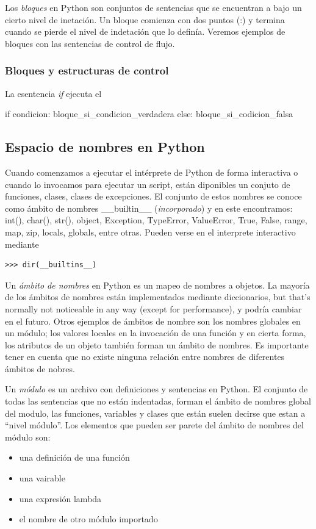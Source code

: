 \documentclass[a4paper]{report}
\begin{document}
Los \emph{bloques} en Python son conjuntos de sentencias que se encuentran a 
bajo un cierto nivel de inetación. Un bloque comienza con dos puntos (:)
y termina cuando se pierde el nivel de indetación que lo definía. Veremos
ejemplos de bloques con las sentencias de control de flujo.

\subsubsection*{Bloques y estructuras de control}
La esentencia \emph{if} ejecuta el 
\begin{python}
if condicion:
    bloque_si_condicion_verdadera
else:
    bloque_si_codicion_falsa
\end{python}





\subsection{Espacio de nombres en Python}
Cuando comenzamos a ejecutar el intérprete de Python de forma interactiva o cuando
lo invocamos para ejecutar un script, están diponibles un conjuto de funciones, clases,
clases de excepciones. El conjunto de estos nombres se conoce como ámbito de nombres 
\_\_builtin\_\_ (\emph{incorporado}) y en este encontramos: int(), char(), str(), object, 
Exception, TypeError, ValueError, True, False, range, map, zip, locals, globals, entre otras.
Pueden verse en el interprete interactivo mediante
\begin{verbatim}
>>> dir(__builtins__)
\end{verbatim}



Un \emph{ámbito de nombres} en Python es un mapeo de nombres a objetos. La mayoría de 
los ámbitos de nombres están implementados mediante diccionarios, but that's normally not noticeable in any
way (except for performance), y podría cambiar en el futuro. Otros ejemplos de ámbitos de nombre
son los nombres globales en un módulo; los valores locales en la invocación de una función y en cierta forma, 
los atributos de un objeto también forman un ámbito de nombres.
Es importante tener en cuenta que no existe ninguna relación entre nombres de diferentes ámbitos de nobres. 

Un \emph{módulo} es un archivo con definiciones y sentencias en Python.
El conjunto de todas las sentencias que no están indentadas, forman el ámbito de nombres global del modulo,
las funciones, variables y clases que están suelen decirse que estan a ``nivel módulo''. Los elementos que pueden
ser parete del ámbito de nombres del módulo son:
\begin{itemize}
  \item una definición de una función
  \item una vairable
  \item una expresión lambda
  \item el nombre de otro módulo importado
\end{itemize}
\end{document}
